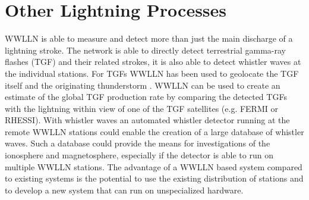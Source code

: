 \section{Other Lightning Processes}

WWLLN is able to measure and detect more than just the main discharge of a lightning stroke.
The network is able to directly detect terrestrial gamma-ray flashes (TGF) and their related strokes, it is also able to detect whistler waves at the individual stations.
For TGFs WWLLN has been used to geolocate the TGF itself and the originating thunderstorm \citep{Connaughton2010, Connaughton2013}.
WWLLN can be used to create an estimate of the global TGF production rate by comparing the detected TGFs with the lightning within view of one of the TGF satellites (e.g. FERMI or RHESSI).
With whistler waves an automated whistler detector running at the remote WWLLN stations could enable the creation of a large database of whistler waves.
Such a database could provide the means for investigations of the ionosphere and magnetosphere, especially if the detector is able to run on multiple WWLLN stations.
The advantage of a WWLLN based system compared to existing systems is the potential to use the existing distribution of stations and to develop a new system that can run on unspecialized hardware.


